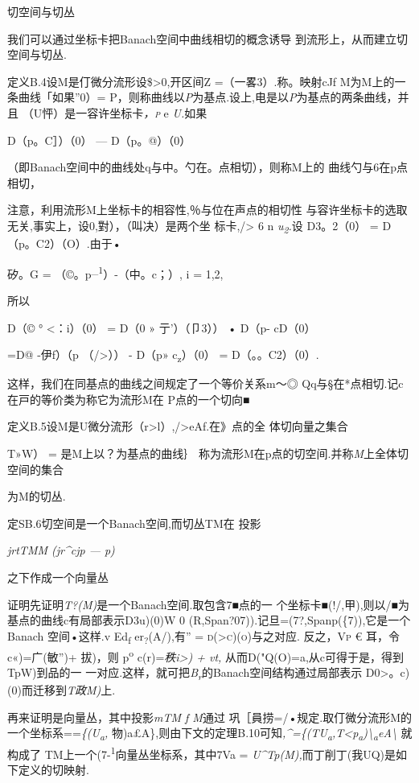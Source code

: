 \documentclass{article}
\begin{document}
切空间与切丛

我们可以通过坐标卡把Banach空间中曲线相切的概念诱导
到流形上，从而建立切空间与切丛.

定义B.4设M是仃微分流形设\$\textgreater{}0,开区间Z =（一畧3）.称。映射cJf
M为M上的一条曲线「如果''0）=
P，则称曲线以\emph{P}为基点.设上,电是以\emph{P}为基点的两条曲线，并且
（U怦）是一容许坐标卡\emph{\textsc{，p}} e \emph{U.}如果

D（p。C］）（0） --- D（p。@）（0）

（即Banach空间中的曲线处q与中。勺在。点相切），则称M上的
曲线勺与6在p点相切，

注意，利用流形M上坐标卡的相容性,％与位在声点的相切性
与容许坐标卡的选取无关,事实上，设0,對），（叫决）是两个坐
标卡,/\textgreater{} 6 n \emph{u\textsubscript{2}.}设 D3。2（0） =
D（p。C2）（O）.由于•

矽。G = （©。p\textsuperscript{\_1}）-（中。c；）, i = 1,2,

所以

D（© ° \textless{}：i）（0） = D（0 » 亍'）（卩3）） • D（p- cD（0）

=D@ -伊f）（p （/\textgreater{}）） - D（p» c\textsubscript{z}）（0） =
D（。。C2）（0）.

这样，我们在同基点的曲线之间规定了一个等价关系m〜◎
Qq与§在*点相切.记c在戸的等价类为称它为流形M在 P点的一个切向■

定义B.5设M是U微分流形（r\textgreater{}l）,/\textgreater{}eAf.在》点的全
体切向量之集合

T»W） = 是M上以？为基点的曲线｝
称为流形M在p点的切空间.并称\emph{M}上全体切空间的集合

为M的切丛.

定SB.6切空间是一个Banach空间,而切丛TM在 投影

\emph{jrtTMM (jr\^{}cjp --- p)}

之下作成一个向量丛

证明先证明\emph{T?(M)}是一个Banach空间.取包含7■点的一
个坐标卡■(!/,甲),则以/■为基点的曲线c有局部表示D3u)(0)W 0
(R,Span?07)).记旦=(7?,Spanp(\{7)),它是一个 Banach 空间•这样.v
Ed\textsubscript{f} er\textsubscript{?}(A/),有'' \textsc{=
d(\textgreater{}c)(o)}与之对应. 反之，\textsc{Vp} € 耳，令 c«)=广(敏'')+
拔)，则 p\textsuperscript{o} c(r)=\emph{秩i\textgreater{}) + vt,}
从而D("Q(O)=a,从c可得于是，得到TpW)到品的一
一对应.这样，就可把\emph{B\textsubscript{r}}的Banach空间结构通过局部表示
D0\textgreater{}。c)(0)而迁移到\emph{T政M)}上.

再来证明是向量丛，其中投影\emph{mTM f M}通过
巩［員捞=/•规定.取仃微分流形M的一个坐标系==\emph{\{(U\textsubscript{a},}
物)\textbar{}a£A\},则由下文的定理B.10可知\emph{,\^{}=\{(TU\textsubscript{a},T\textless{}p\textsubscript{a})\textbackslash{}\textsubscript{a}eA\textbackslash{}}
就构成了 TM上一个(7-\textsuperscript{1}向量丛坐标系，其中7Va =
\emph{U\^{}Tp(M),}而丁削丁(我UQ)是如下定义的切映射.
\end{document}

